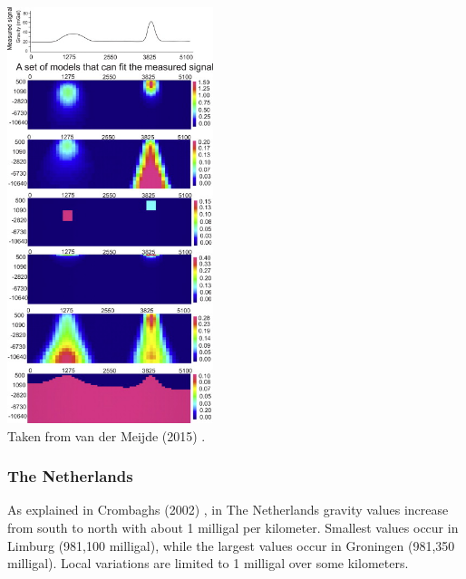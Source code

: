 \begin{center}
\includegraphics[width=6cm]{images/gravity/nonunique}\\
{\captionfont Taken from van der Meijde \etal (2015) \cite{vapb15}.}
\end{center}


\subsubsection{The Netherlands}

As explained in Crombaghs \etal (2002) \cite{crdv02},  
in The Netherlands gravity values
increase from south to north with about 1 milligal per kilometer. Smallest values occur
in Limburg (981,100 milligal), while the largest values occur in Groningen (981,350
milligal). Local variations are limited to 1 milligal over some kilometers.


